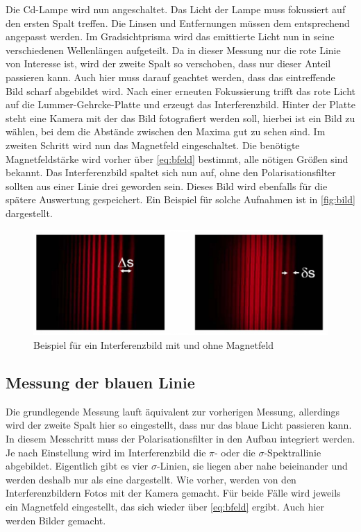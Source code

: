 Die Cd-Lampe wird nun angeschaltet.
Das Licht der Lampe muss fokussiert auf den ersten Spalt treffen. 
Die Linsen und Entfernungen müssen dem entsprechend angepasst werden.
Im Gradsichtprisma wird das emittierte Licht nun in seine verschiedenen Wellenlängen aufgeteilt.
Da in dieser Messung nur die rote Linie von Interesse ist, wird der zweite Spalt so verschoben, dass nur dieser Anteil passieren kann. 
Auch hier muss darauf geachtet werden, dass das eintreffende Bild scharf abgebildet wird. 
Nach einer erneuten Fokussierung trifft das rote Licht auf die Lummer-Gehrcke-Platte und erzeugt das Interferenzbild.
Hinter der Platte steht eine Kamera mit der das Bild fotografiert werden soll, hierbei ist ein Bild zu wählen, bei dem die Abstände zwischen den Maxima gut zu sehen sind.
Im zweiten Schritt wird nun das Magnetfeld eingeschaltet. 
Die benötigte Magnetfeldstärke wird vorher über \autoref{eq:bfeld} bestimmt, alle nötigen Größen sind bekannt. 
Das Interferenzbild spaltet sich nun auf, ohne den Polarisationsfilter sollten aus einer Linie drei geworden sein.
Dieses Bild wird ebenfalls für die spätere Auswertung gespeichert.
Ein Beispiel für solche Aufnahmen ist in \autoref{fig:bild} dargestellt.
\begin{figure}
    \centering
    \includegraphics[width=\textwidth]{images/bild.png}
    \caption{Beispiel für ein Interferenzbild mit und ohne Magnetfeld \cite{V27}}
    \label{fig:bild}
\end{figure}

\subsection{Messung der blauen Linie}
\label{ssec:durch3}

Die grundlegende Messung lauft äquivalent zur vorherigen Messung, allerdings wird der zweite Spalt hier so eingestellt, dass nur das blaue Licht passieren kann.
In diesem Messchritt muss der Polarisationsfilter in den Aufbau integriert werden. 
Je nach Einstellung wird im Interferenzbild die $\pi$- oder die $\sigma$-Spektrallinie abgebildet. 
Eigentlich gibt es vier $\sigma$-Linien, sie liegen aber nahe beieinander und werden deshalb nur als eine dargestellt. 
Wie vorher, werden von den Interferenzbildern Fotos mit der Kamera gemacht.
Für beide Fälle wird jeweils ein Magnetfeld eingestellt, das sich wieder über \autoref{eq:bfeld} ergibt.
Auch hier werden Bilder gemacht.
